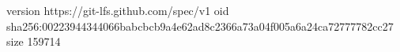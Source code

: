 version https://git-lfs.github.com/spec/v1
oid sha256:00223944344066babcbcb9a4e62ad8c2366a73a04f005a6a24ca72777782cc27
size 159714
